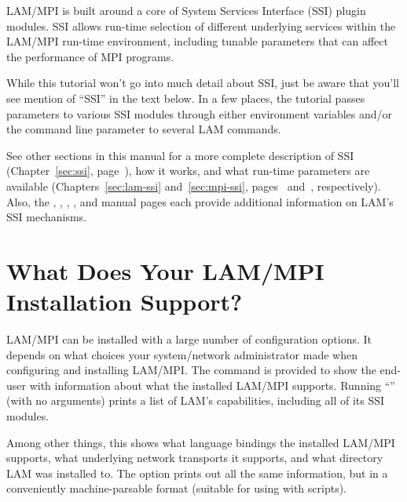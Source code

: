 LAM/MPI is built around a core of System Services Interface (SSI)
plugin modules.  SSI allows run-time selection of different underlying
services within the LAM/MPI run-time environment, including tunable
parameters that can affect the performance of MPI programs.

While this tutorial won't go into much detail about SSI, just be aware
that you'll see mention of ``SSI'' in the text below.  In a few
places, the tutorial passes parameters to various SSI modules through
either environment variables and/or the  command line
parameter to several LAM commands.

See other sections in this manual for a more complete description of
SSI (Chapter~\ref{sec:ssi}, page~\pageref{sec:ssi}), how it works, and
what run-time parameters are available (Chapters~\ref{sec:lam-ssi}
and~\ref{sec:mpi-ssi}, pages~\pageref{sec:lam-ssi}
and~\pageref{sec:mpi-ssi}, respectively).  Also, the
, ,
, , and
 manual pages each provide additional
information on LAM's SSI mechanisms.
 

\section{What Does Your LAM/MPI Installation Support?}

LAM/MPI can be installed with a large number of configuration options.
It depends on what choices your system/network administrator made when
configuring and installing LAM/MPI.  The  command is
provided to show the end-user with information about what the
installed LAM/MPI supports.  Running ``'' (with no
arguments) prints a list of LAM's capabilities, including all of its
SSI modules.

Among other things, this shows what language bindings the installed
LAM/MPI supports, what underlying network transports it supports, and
what directory LAM was installed to.  The  option
prints out all the same information, but in a conveniently
machine-parsable format (suitable for using with scripts).


